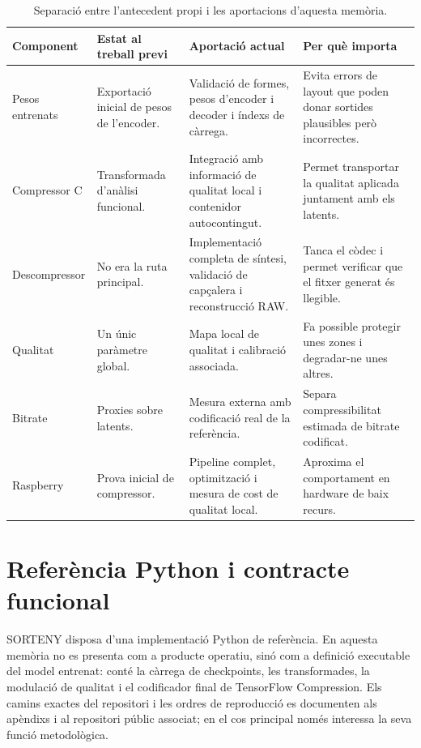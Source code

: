 \begin{table}[H]
\centering
\scriptsize
\begin{tabularx}{\textwidth}{p{2.9cm}X X X}
\toprule
Component & Estat al treball previ & Aportació actual & Per què importa \\
\midrule
Pesos entrenats & Exportació inicial de pesos de l'encoder. & Validació de
formes, pesos d'encoder i decoder i índexs de càrrega. & Evita errors de
layout que poden donar sortides plausibles però incorrectes. \\
Compressor C & Transformada d'anàlisi funcional. & Integració amb informació
de qualitat local i contenidor autocontingut. & Permet transportar la qualitat
aplicada juntament amb els latents. \\
Descompressor & No era la ruta principal. & Implementació completa de síntesi,
validació de capçalera i reconstrucció RAW. & Tanca el còdec i permet verificar
que el fitxer generat és llegible. \\
Qualitat & Un únic paràmetre global. & Mapa local de qualitat i calibració
associada. & Fa possible protegir unes zones i degradar-ne unes altres. \\
Bitrate & Proxies sobre latents. & Mesura externa amb codificació real de la
referència. & Separa compressibilitat estimada de bitrate codificat. \\
Raspberry & Prova inicial de compressor. & Pipeline complet, optimització i
mesura de cost de qualitat local. & Aproxima el comportament en hardware de
baix recurs. \\
\bottomrule
\end{tabularx}
\caption{Separació entre l'antecedent propi i les aportacions d'aquesta
memòria.}
\label{tab:herencia}
\end{table}

\section{Referència Python i contracte funcional}\label{sec:python_ref}

SORTENY disposa d'una implementació Python de referència. En aquesta memòria
no es presenta com a producte operatiu, sinó com a definició executable del
model entrenat: conté la càrrega de checkpoints, les transformades, la
modulació de qualitat i el codificador final de TensorFlow Compression. Els
camins exactes del repositori i les ordres de reproducció es documenten als
apèndixs i al repositori públic associat; en el cos principal només interessa
la seva funció metodològica.

